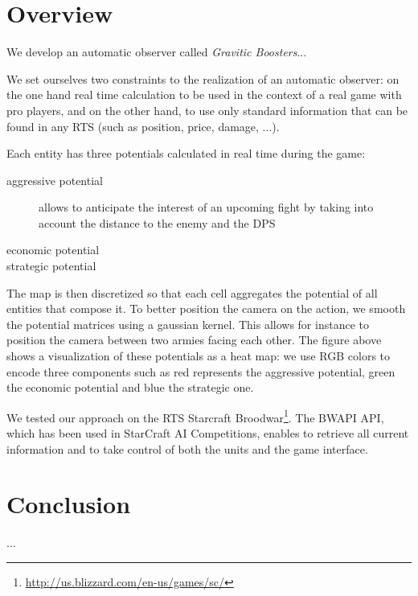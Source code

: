 \documentclass{jfsma}
\begin{document}
\section{Overview}
We develop an automatic observer called \emph{Gravitic Boosters}...

We set ourselves two constraints to the realization of an automatic observer: on the one hand real time calculation to be used in the context of a real game with pro players, and on the other hand, to use only standard information that can be found in any RTS (such as position, price, damage, ...).

Each entity has three potentials calculated in real time during the game:
\begin{description}
\item[aggressive potential] allows to anticipate the interest of an upcoming fight by taking into account the distance to the enemy and the DPS
\item[economic potential]
\item[strategic potential]
\end{description}

The map is then discretized so that each cell aggregates the potential of all entities that compose it. To better position the camera on the action, we smooth the potential matrices using a gaussian kernel. This allows for instance to position the camera between two armies facing each other. The figure above shows a visualization of these potentials as a heat map: we use RGB colors to encode three components such as red represents the aggressive potential, green the economic potential and blue the strategic one.

We tested our approach on the RTS Starcraft Broodwar\footnote{\url{http://us.blizzard.com/en-us/games/sc/}}. The BWAPI API\cite{}, which has been used in StarCraft AI Competitions\cite{}, enables to retrieve all current information and to take control of both the units and the game interface. 
        
\section{Conclusion}
...
\end{document}
